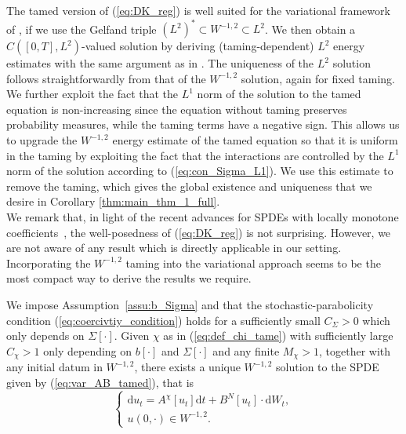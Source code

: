  The tamed version of (\ref{eq:DK_reg}) is well suited for the variational framework of \cite{RSZ22,LR15}, if we use the Gelfand triple $(L^2)^* \subset W^{-1,2} \subset L^2$. We then obtain a $C([0,T],L^2)$-valued solution by deriving (taming-dependent) $L^2$ energy estimates with the same argument as in \cite{DKP23}. The uniqueness of the $L^2$ solution follows straightforwardly from that of the $W^{-1,2}$ solution, again for fixed taming. \\

We further exploit the fact that the $L^1$ norm of the solution to the tamed equation is non-increasing since the equation without taming preserves probability measures, while the taming terms have a negative sign. This allows us to upgrade the $W^{-1,2}$ energy estimate of the tamed equation so that it is uniform in the taming by exploiting the fact that the interactions are controlled by the $L^1$ norm of the solution according to (\ref{eq:con_Sigma_L1}). We use this estimate to remove the taming, which gives the global existence and uniqueness that we desire in Corollary \ref{thm:main_thm_1_full}.\\

We remark that, in light of the recent advances for SPDEs with locally monotone coefficients~\cite{RSZ22,LR15}, the well-posedness of (\ref{eq:DK_reg}) is not surprising. However, we are not aware of any result which is directly applicable in our setting. Incorporating the $W^{-1,2}$ taming into the variational approach seems to be the most compact way to derive the results we require.

\begin{lem}\label{lem:WP_tamed}We impose Assumption~\ref{assu:b_Sigma} and that the stochastic-parabolicity condition (\ref{eq:coercivtiy_condition}) holds for a sufficiently small $C_{\Sigma} > 0$ which only depends on $\Sigma[\cdot]$. Given $\chi$ as in (\ref{eq:def_chi_tame}) with sufficiently large $C_{\chi} > 1$ only depending on $b[\cdot]$ and $\Sigma[\cdot]$ and any finite $M_{\chi} > 1$, together with any initial datum in $W^{-1,2}$, there exists a unique $W^{-1,2}$ solution to the SPDE given by (\ref{eq:var_AB_tamed}), that is 
\begin{equation}\label{eq:tamed_equation}
    \begin{cases}
        \mathrm{d}u_t=A^{\chi}[u_t]\mathrm{d}t + B^N[u_t]\cdot\mathrm{d}W_t,\\
        u(0,\cdot) \in W^{-1,2}.
    \end{cases}
\end{equation}
\end{lem}

